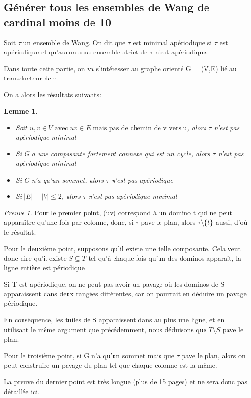 \documentclass{scrartcl}
\renewcommand{\le}{\leqslant}
\newcommand{\sube}{\subseteq}
\newtheorem{lemme}{Lemme}
\theoremstyle{definition}
\theoremstyle{remark}
\newtheorem{preuve}{Preuve}
\begin{document}
\subsection{Générer tous les ensembles de Wang de cardinal moins de 10}

Soit $\tau$ un ensemble de Wang. On dit que $\tau$ est minimal apériodique si $\tau$ est apériodique
et qu'aucun sous-ensemble strict de $\tau$ n'est apériodique.

\;

Dans toute cette partie, on va s'intéresser au graphe orienté G = (V,E) lié au transducteur de $\tau$.

On a alors les résultats suivants:

\begin{lemme}

\begin{itemize}
    \item Soit $u,v \in V \text{ avec } uv \in E \text{ mais pas de chemin de v vers u}$, alors $\tau$ n'est pas apériodique minimal
    \item Si G a une composante fortement connexe qui est un cycle, alors $\tau$ n'est pas apériodique minimal
    \item Si G n'a qu'un sommet, alors $\tau$ n'est pas apériodique
    \item Si $|E|-|V| \le 2$, alors $\tau$ n'est pas apériodique minimal
\end{itemize}

\end{lemme}

\begin{preuve}
    
Pour le premier point, (uv) correspond à un domino t qui ne peut apparaître qu'une fois par colonne,
donc, si $\tau$ pave le plan, alors $\tau \setminus \{t \}$ aussi, d'où le résultat.

\;

Pour le deuxième point, supposons qu'il existe une telle composante. Cela veut donc dire qu'il existe $S \sube T$
tel qu'à chaque fois qu'un des dominos apparaît, la ligne entière est périodique

Si T est apériodique, on ne peut pas avoir un pavage où les dominos de S apparaissent dans deux rangées différentes, car on pourrait en déduire un pavage périodique.

En conséquence, les tuiles de S apparaissent dans au plus une ligne, et en utilisant le même argument que précédemment, nous déduisons que $T \setminus S$ pave le plan.

\;

Pour le troisième point, si G n'a qu'un sommet mais que $\tau$ pave le plan, alors on peut construire un pavage
du plan tel que chaque colonne est la même.

\;

La preuve du dernier point est très longue (plus de 15 pages) et ne sera donc pas détaillée ici.

\end{preuve}
\end{document}
